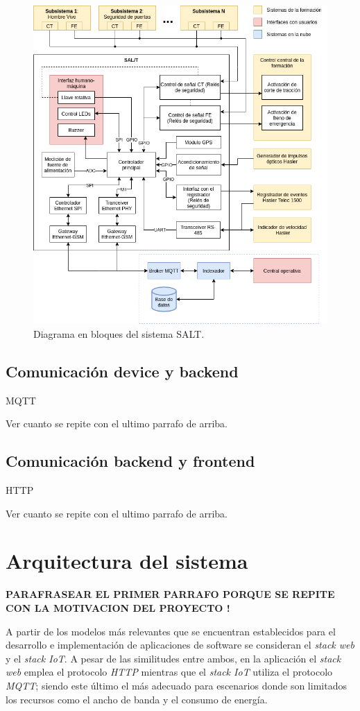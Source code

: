 \begin{figure}[htpb]
\centering 
\includegraphics[width=.8\textwidth]{Figures/diagrama_salt_con_central.png}
\caption{Diagrama en bloques del sistema SALT.}
\label{fig:diagBloques}
\end{figure}

\subsection{Comunicación device y backend}

MQTT

Ver cuanto se repite con el ultimo parrafo de arriba.

\subsection{Comunicación backend y frontend}

HTTP

Ver cuanto se repite con el ultimo parrafo de arriba.


\section{Arquitectura del sistema}


\textbf{PARAFRASEAR EL PRIMER PARRAFO PORQUE SE REPITE CON LA MOTIVACION DEL PROYECTO !}

A partir de los modelos más relevantes que se encuentran establecidos para el desarrollo e implementación de aplicaciones de software se consideran el \textit{stack web} y el \textit{stack IoT}. A pesar de las similitudes entre ambos, en la aplicación el \textit{stack web} emplea el protocolo \textit{HTTP} mientras que el \textit{stack IoT} utiliza el protocolo \textit{MQTT}; siendo este último el más adecuado para escenarios donde son limitados los recursos como el ancho de banda y el consumo de energía.

